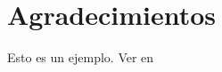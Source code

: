 \chapter*{Agradecimientos}
\thispagestyle{empty}
\label{cap:agradecimientos}

Esto es un ejemplo. Ver en  \cite{darwin2009origen} \cite{del1984luces}

\afterpage{\null\newpage}
\pagestyle{empty}